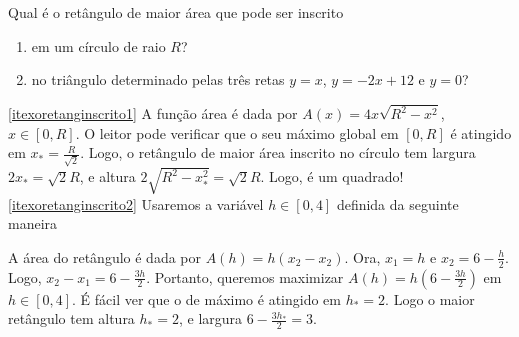 \begin{exo}
Qual é o retângulo de maior área que pode ser inscrito 
\begin{enumerate}
 \item\label{itexoretanginscrito1} em um círculo de raio $R$?
\item\label{itexoretanginscrito2} no triângulo determinado pelas três retas
$y=x$, $y=-2x+12$ e $y=0$?
\end{enumerate}

\begin{sol} \eqref{itexoretanginscrito1}
A função área é dada por $A(x)=4x\sqrt{R^2-x^2}$, $x\in [0,R]$. O leitor pode
verificar que o seu máximo global em $[0,R]$ é atingido em
$x_*=\frac{R}{\sqrt{2}}$. Logo, o retângulo de maior área inscrito no círculo
tem largura $2x_*=\sqrt{2}R$, e altura $2\sqrt{R^2-x_*^2}=\sqrt{2}R$. Logo, é
um quadrado!
\eqref{itexoretanginscrito2} Usaremos a variável $h\in [0,4]$ definida da
seguinte maneira
\begin{center}
\begin{bmlimage}\end{bmlimage}
\end{center}
A área do retângulo é dada por $A(h)=h(x_2-x_2)$. Ora, $x_1=h$ e
$x_2=6-\frac{h}{2}$. Logo, $x_2-x_1=6-\frac{3h}{2}$. Portanto,
queremos maximizar $A(h)=h(6-\frac{3h}{2})$ em
$h\in [0,4]$.
É fácil ver que o de máximo é atingido em $h_*=2$. Logo o maior retângulo tem
altura $h_*=2$, e largura $6-\frac{3h_*}{2}=3$.
\end{sol}
\end{exo}

